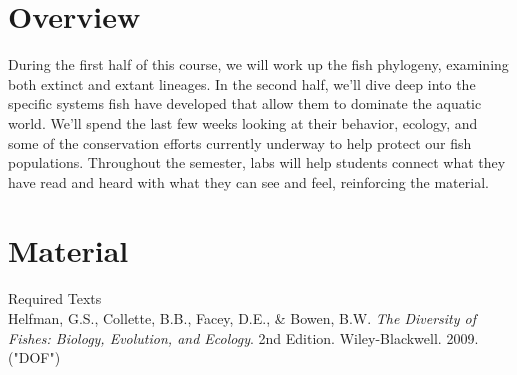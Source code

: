 \documentclass[letterpaper]{inzane_syllabus} %
\begin{document}


\makeprofile %

\section{Overview}

During the first half of this course, we will work up the fish phylogeny, examining both extinct and extant lineages. In the second half, we'll dive deep into the specific systems fish have developed that allow them to dominate the aquatic world. We'll spend the last few weeks looking at their behavior, ecology, and some of the conservation efforts currently underway to help protect our fish populations. Throughout the semester, labs will help students connect what they have read and heard with what they can see and feel, reinforcing the material.

\vspace{0.5cm} %
\section{Material}

{\color{myGreen} Required Texts}\\
Helfman, G.S., Collette, B.B., Facey, D.E., \& Bowen, B.W. \textit{The Diversity of Fishes: Biology, Evolution, and Ecology}. 2nd Edition. Wiley-Blackwell. 2009. ("DOF") \\
\end{document}
